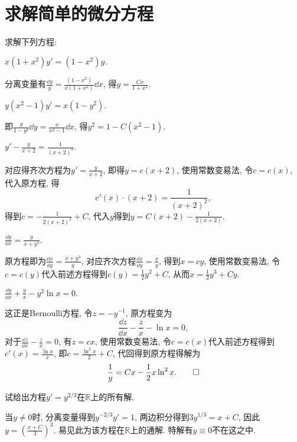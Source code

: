 \section{求解简单的微分方程}
\begin{quiza}
\woe 求解下列方程:
\begin{quizs}
\item \(x(1+x^2)y'=(1-x^2)y.\)
\begin{solution}
分离变量有\(\frac{\dd y}{y}=\frac{(1-x^2)}{x(1+x^2)}\dd x\), 得\(y=\frac{Cx}{1+x^2}.\)
\end{solution}
\item \(y(x^2-1)y'=x(1-y^2).\)
\begin{solution}
即\(\frac{y}{1-y^2}\dd y=\frac{x}{x^2-1}\dd x\), 得\(y^2=1-C(x^2-1).\)
\end{solution}
\item \(y'-\frac{y}{x+2}=\frac{1}{(x+2)^2}.\)
\begin{solution}
对应得齐次方程为\(y'=\frac{y}{x+2}\), 即得\(y=c(x+2)\), 使用常数变易法, 令\(c=c(x)\), 代入原方程, 得\[c'(x)\cdot(x+2)=\frac{1}{(x+2)^2},\]得到\(c=-\frac{1}{2(x+2)^2}+C\), 代入\(y\)得到\(y=C(x+2)-\frac{1}{2(x+2)}.\)
\end{solution}
\item \(\frac{\dd y}{\dd x}=\frac{y}{x+y^3}\).
\begin{solution}
原方程即为\(\frac{\dd x}{\dd y}=\frac{x+y^3}{y}\), 对应齐次方程\(\frac{\dd x}{\dd y}=\frac{x}{y}\), 得到\(x=cy\), 使用常数变易法, 令\(c=c(y)\)代入前述方程得到\(c(y)=\frac{1}{2}y^2+C\), 从而\(x=\frac{1}{2}y^3+Cy\).
\end{solution}
\item \(\frac{\dd y}{\dd x}+\frac{y}{x}-y^2\ln x=0.\)
\begin{solution}
这正是Bernoulli方程, 令\(z=-y^{-1}\), 原方程变为\[\frac{\dd z}{\dd x}-\frac{z}{x}-\ln x=0,\]对于\(\frac{\dd z}{\dd x}-\frac{z}{x}=0\), 有\(z=cx\), 使用常数变易法, 令\(c=c(x)\)代入前述方程得到\(c'(x)=\frac{\ln x}{x}\), 即\(c=\frac{\ln^2x}{2}+C\), 代回得到原方程得解为\[\frac{1}{y}=Cx-\frac{1}{2}x\ln^2x.\qedhere\]
\end{solution}
\end{quizs}
\woe 试给出方程\(y'=y^{2/3}\)在\(\mathbb{R}\)上的所有解.
\begin{solution}
当\(y\ne 0\)时, 分离变量得到\(y^{-2/3}y'=1\), 两边积分得到\(3y^{1/3}=x+C\), 因此\(y=\left(\frac{x+C}{3}\right)^3\). 易见此为该方程在\(\mathbb{R}\)上的通解. 特解有\(y \equiv 0\)不在这之中.
\end{solution}
\end{quiza}


